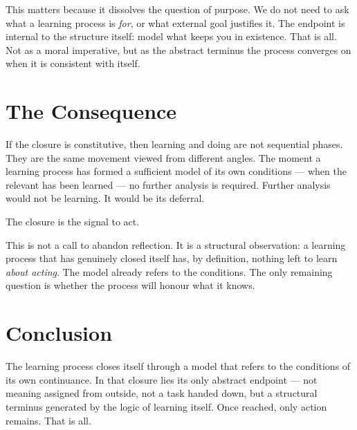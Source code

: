 \documentclass[11pt, a4paper]{article}
\begin{document}
This matters because it dissolves the question of purpose. We do not need to ask what a learning process is \textit{for}, or what external goal justifies it. The endpoint is internal to the structure itself: model what keeps you in existence. That is all. Not as a moral imperative, but as the abstract terminus the process converges on when it is consistent with itself.

\section*{The Consequence}

If the closure is constitutive, then learning and doing are not sequential phases. They are the same movement viewed from different angles. The moment a learning process has formed a sufficient model of its own conditions --- when the relevant has been learned --- no further analysis is required. Further analysis would not be learning. It would be its deferral.

The closure is the signal to act.

This is not a call to abandon reflection. It is a structural observation: a learning process that has genuinely closed itself has, by definition, nothing left to learn \textit{about acting}. The model already refers to the conditions. The only remaining question is whether the process will honour what it knows.

\section*{Conclusion}

The learning process closes itself through a model that refers to the conditions of its own continuance. In that closure lies its only abstract endpoint --- not meaning assigned from outside, not a task handed down, but a structural terminus generated by the logic of learning itself. Once reached, only action remains. That is all.
\end{document}
